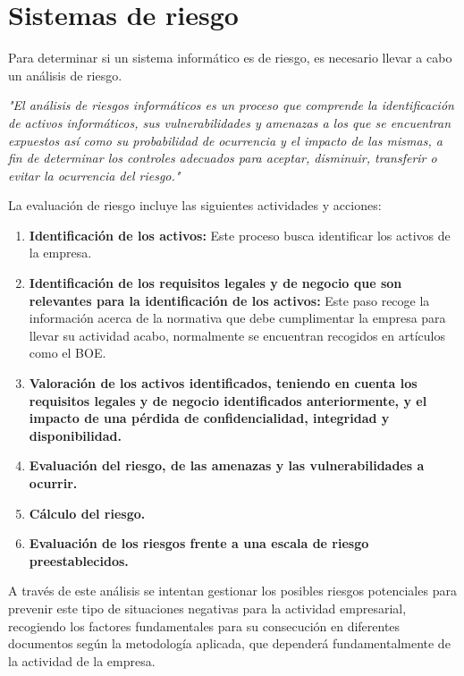 \chapter{Sistemas de riesgo}
\label{cha:sistemas-de-riesgo}
Para determinar si un sistema informático es de riesgo, es necesario llevar a cabo un análisis de riesgo.

\emph{"El análisis de riesgos informáticos es un proceso que comprende la identificación de activos informáticos, sus vulnerabilidades y amenazas a los que se encuentran expuestos así como su probabilidad de ocurrencia y el impacto de las mismas, a fin de determinar los controles adecuados para aceptar, disminuir, transferir o evitar la ocurrencia del riesgo."\cite{wikip}}
        
La evaluación de riesgo incluye las siguientes actividades y acciones\cite{gestion_activos}:
\begin{enumerate}
\item {\bfseries Identificación de los activos:}
Este proceso busca identificar los activos de la empresa.
\item {\bfseries Identificación de los requisitos legales y de negocio que son relevantes para la identificación de los activos:}
Este paso recoge la información acerca de la normativa que debe cumplimentar la empresa para llevar su actividad acabo, normalmente se encuentran recogidos en artículos como el BOE.
\item {\bfseries Valoración de los activos identificados, teniendo en cuenta los requisitos legales y de negocio identificados anteriormente, y el impacto de una pérdida de confidencialidad, integridad y disponibilidad.}
\item {\bfseries Evaluación del riesgo, de las amenazas y las vulnerabilidades a ocurrir.}
\item {\bfseries Cálculo del riesgo. }
\item {\bfseries Evaluación de los riesgos frente a una escala de riesgo preestablecidos.}
\end{enumerate}

A través de este análisis se intentan gestionar los posibles riesgos potenciales para prevenir este tipo de situaciones negativas para la actividad empresarial, recogiendo los factores fundamentales para su consecución en diferentes documentos según la metodología aplicada, que dependerá fundamentalmente de la actividad de la empresa.

